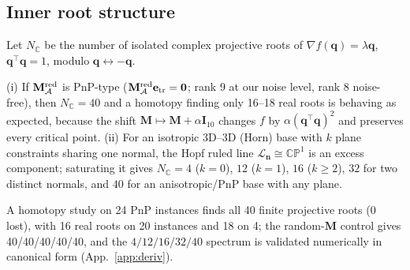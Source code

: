 \subsection{Inner root structure}\label{sec:spectrum}
Let $N_{\mathbb C}$ be the number of isolated complex projective roots of $\nabla f(\mathbf q)=\lambda\mathbf q$, $\mathbf q^\top\mathbf q=1$, modulo $\mathbf q\leftrightarrow-\mathbf q$.
\begin{theorem}\label{thm:spectrum}
(i) If $\mathbf M^{\rm red}_{\mathcal A}$ is PnP-type ($\mathbf M^{\rm red}_{\mathcal A}\mathbf e_{\rm tr}=\mathbf 0$; rank 9 at our noise level, rank 8 noise-free), then $N_{\mathbb C}=40$ and a homotopy finding only 16--18 real roots is behaving as expected, because the shift $\mathbf M\mapsto\mathbf M+\alpha\mathbf I_{10}$ changes $f$ by $\alpha(\mathbf q^\top\mathbf q)^2$ and preserves every critical point. (ii) For an isotropic 3D--3D (Horn) base with $k$ plane constraints sharing one normal, the Hopf ruled line $\mathcal L_{\mathbf n}\cong\mathbb{CP}^1$ is an excess component; saturating it gives $N_{\mathbb C}=4$ ($k=0$), $12$ ($k=1$), $16$ ($k\ge2$), $32$ for two distinct normals, and $40$ for an anisotropic/PnP base with any plane.
\end{theorem}
A homotopy study on 24 PnP instances finds all 40 finite projective roots (0 lost), with 16 real roots on 20 instances and 18 on 4; the random-$\mathbf M$ control gives 40/40/40/40/40, and the $4/12/16/32/40$ spectrum is validated numerically in canonical form (App.~\ref{app:deriv}).
